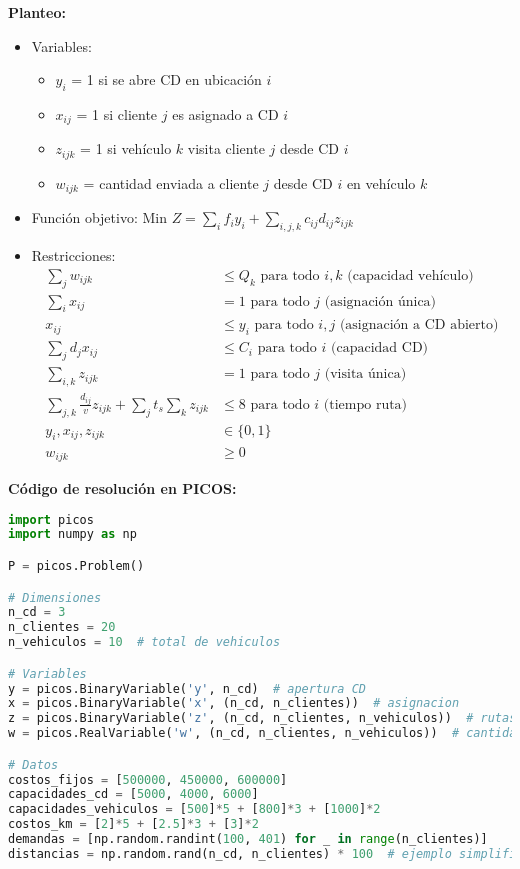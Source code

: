 \documentclass[12pt]{article}
\begin{document}
\begin{enumerate}
\textbf{Planteo:}
\begin{itemize}
\item Variables:
  \begin{itemize}
  \item $y_i$ = 1 si se abre CD en ubicación $i$
  \item $x_{ij}$ = 1 si cliente $j$ es asignado a CD $i$
  \item $z_{ijk}$ = 1 si vehículo $k$ visita cliente $j$ desde CD $i$
  \item $w_{ijk}$ = cantidad enviada a cliente $j$ desde CD $i$ en vehículo $k$
  \end{itemize}
\item Función objetivo: Min $Z = \sum_i f_iy_i + \sum_{i,j,k} c_{ij}d_{ij}z_{ijk}$
\item Restricciones:
  \begin{align*}
  \sum_j w_{ijk} &\leq Q_k \text{ para todo } i,k \text{ (capacidad vehículo)} \\
  \sum_i x_{ij} &= 1 \text{ para todo } j \text{ (asignación única)} \\
  x_{ij} &\leq y_i \text{ para todo } i,j \text{ (asignación a CD abierto)} \\
  \sum_j d_jx_{ij} &\leq C_i \text{ para todo } i \text{ (capacidad CD)} \\
  \sum_{i,k} z_{ijk} &= 1 \text{ para todo } j \text{ (visita única)} \\
  \sum_{j,k} \frac{d_{ij}}{v}z_{ijk} + \sum_j t_s\sum_k z_{ijk} &\leq 8 \text{ para todo } i \text{ (tiempo ruta)} \\
  y_i, x_{ij}, z_{ijk} &\in \{0,1\} \\
  w_{ijk} &\geq 0
  \end{align*}
\end{itemize}

\textbf{Código de resolución en PICOS:}
\begin{lstlisting}[language=Python]
import picos
import numpy as np

P = picos.Problem()

# Dimensiones
n_cd = 3
n_clientes = 20
n_vehiculos = 10  # total de vehiculos

# Variables
y = picos.BinaryVariable('y', n_cd)  # apertura CD
x = picos.BinaryVariable('x', (n_cd, n_clientes))  # asignacion
z = picos.BinaryVariable('z', (n_cd, n_clientes, n_vehiculos))  # rutas
w = picos.RealVariable('w', (n_cd, n_clientes, n_vehiculos))  # cantidades

# Datos
costos_fijos = [500000, 450000, 600000]
capacidades_cd = [5000, 4000, 6000]
capacidades_vehiculos = [500]*5 + [800]*3 + [1000]*2
costos_km = [2]*5 + [2.5]*3 + [3]*2
demandas = [np.random.randint(100, 401) for _ in range(n_clientes)]
distancias = np.random.rand(n_cd, n_clientes) * 100  # ejemplo simplificado


\end{lstlisting}
\end{enumerate}
\end{document}

